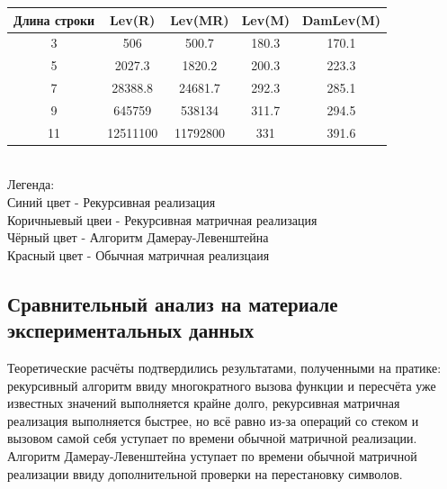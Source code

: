 \documentclass[12pt,a4paper]{article}
\begin{document}
\begin{center}
	\begin{tabular}{|c c c c c|} 
 	\hline
	Длина строки & Lev(R) & Lev(MR) & Lev(M) & DamLev(M) \\ [0.5ex] 
 	\hline\hline
	3 & 506 & 500.7 & 180.3 & 170.1\\
 	\hline
	5 & 2027.3 & 1820.2 & 200.3 & 223.3\\
 	\hline
 	7 & 28388.8 & 24681.7 & 292.3 & 285.1\\
 	\hline
 	9 & 645759  & 538134 & 311.7 & 294.5\\
 	\hline
	11 & 12511100 & 11792800 & 331 & 391.6\\
	\hline
	\end{tabular}
\end{center}

\begin{center}
	\\
	Легенда:\\
	Синий цвет - Рекурсивная реализация\\
	Коричныевый цвеи - Рекурсивная матричная реализация\\
	Чёрный цвет - Алгоритм Дамерау-Левенштейна\\
	Красный цвет - Обычная матричная реализцаия\\
	
\end{center}
\subsection{Сравнительный анализ на материале экспериментальных данных}
Теоретические расчёты подтвердились результатами, полученными на пратике: рекурсивный алгоритм ввиду многократного вызова функции и пересчёта уже известных значений выполняется крайне долго, рекурсивная матричная реализация выполняется быстрее, но всё равно из-за операций со стеком и вызовом самой себя уступает по времени обычной матричной реализации. Алгоритм Дамерау-Левенштейна уступает по времени обычной матричной реализации ввиду дополнительной проверки на перестановку символов.
\clearpage
{}
\end{document}

